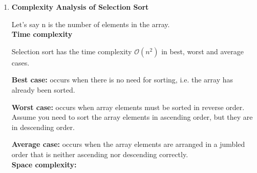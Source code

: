 \documentclass[11pt,a4paper]{article}
\begin{document}
{\begin{enumerate}[label=\textbf{\arabic*})]
				The selection sort simply partition the list into two main logical parts, the sorted part and the unsorted part. Any iteration picks a value from the unsorted and places it in the sorted list, making the sort partition grow in size while the unsorted partition shrinks for each iteration. When adding to the sorted list, the algorithm makes sure that the value is added at the right position to ensure an order sequence of the sorted partition. The process is terminated when the number of items or the size of the unsorted is one (1). The procedure to select a value to be moved to the sorted list will return minimum value or maximum value in the unsorted partition, which will be swapped to position the item correctly. 
				\\[12pt]
				\item \textbf{Complexity Analysis of Selection Sort}
					
					Let’s say n is the number of elements in the array. 
					\\[9pt]
					\textbf{Time complexity}
					
					Selection sort has the time complexity $\mathcal{O}(n^2)$ in best, worst and average cases.
					
					\textbf{Best case:} occurs when there is no need for sorting, i.e. the array has already been sorted.
					
					\textbf{Worst case:} occurs when array elements must be sorted in reverse order. Assume you need to sort the array elements in ascending order, but they are in descending order.
					
					\textbf{Average case:} occurs when the array elements are arranged in a jumbled order that is neither ascending nor descending correctly.
					\\[9pt]
					\textbf{Space complexity:}
					

\end{enumerate}}
\end{document}
